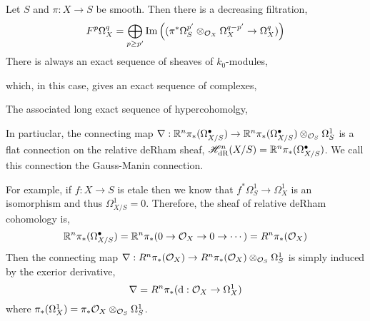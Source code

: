 \documentclass[12pt]{article}
\begin{document}
\begin{definition}
Let $S$ and $\pi : X \to S$ be smooth. Then there is a decreasing filtration,
\[ F^p \Omega_X^q = \bigoplus_{p \ge p'} \mathrm{Im}\left( ( \pi^* \Omega_S^{p'} \otimes_{\mathcal{O}_{X}} \Omega^{q-p'}_X \to \Omega^q_X) \right) \]
There is always an exact sequence of sheaves of $k_0$-modules,
\begin{center}
\end{center}
which, in this case, gives an exact sequence of complexes,
\begin{center}
\end{center}
The associated long exact sequence of hypercohomolgy,  
\begin{center}
\end{center}
In partiuclar, the connecting map $\nabla : \mathbb{R}^n \pi_* (\Omega^\bullet_{X / S}) \to\mathbb{R}^{n} \pi_* (\Omega^{\bullet}_{X / S}) \otimes_{\mathcal{O}_{S}} \Omega^1_S$ 
is a flat connection on the relative deRham sheaf, $\mathscr{H}^n_{\mathrm{dR}}(X / S) = \mathbb{R}^n \pi_*(\Omega^\bullet_{X / S})$. We call this connection the Gauss-Manin connection.
\end{definition}

\begin{remark}
For example, if $f : X \to S$ is etale then we know that $f^* \Omega^1_S \to \Omega^1_X$ is an isomorphism and thus $\Omega^1_{X / S} = 0$. Therefore, the sheaf of relative deRham cohomology is,
\[ \mathbb{R}^n \pi_* (\Omega^\bullet_{X / S}) = \mathbb{R}^n \pi_* (0 \to \mathcal{O}_{X} \to 0 \to \cdots) = R^n \pi_*(\mathcal{O}_{X}) \]
Then the connecting map $\nabla : R^n \pi_*(\mathcal{O}_{X}) \to R^n \pi_*(\mathcal{O}_{X}) \otimes_{\mathcal{O}_{S}} \Omega^1_S$ is simply induced by the exerior derivative,
\[ \nabla  = R^n \pi_*(\mathrm{d}{} : \mathcal{O}_{X} \to \Omega^1_X) \]
where $\pi_* (\Omega^1_X) = \pi_* \mathcal{O}_{X} \otimes_{\mathcal{O}_{S}} \Omega^1_S$.
\end{remark}
\end{document}
